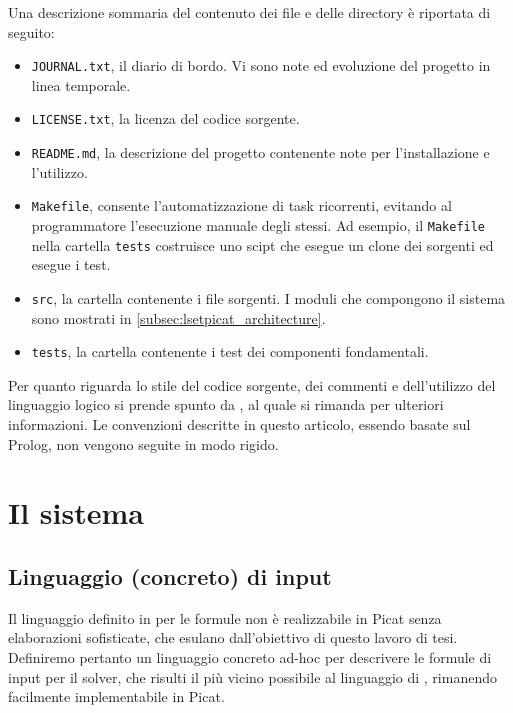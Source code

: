 \documentclass[12pt,a4paper,openright]{book} %
\begin{document}
Una descrizione sommaria del contenuto dei file e delle directory è
riportata di seguito:
\begin{itemize}
	\item \texttt{JOURNAL.txt}, il diario di bordo. Vi sono note
          ed evoluzione del progetto in linea temporale.
	\item \texttt{LICENSE.txt}, la licenza del codice sorgente.
	\item \texttt{README.md}, la descrizione del progetto
          contenente note per l'installazione e l'utilizzo.
	\item \texttt{Makefile}, consente l'automatizzazione di task
          ricorrenti, evitando al programmatore l'esecuzione manuale
          degli stessi. Ad esempio, il \texttt{Makefile} nella
          cartella \texttt{tests} costruisce uno scipt che esegue un
          clone dei sorgenti ed esegue i test.
	\item \texttt{src}, la cartella contenente i file sorgenti. I
          moduli che compongono il sistema sono mostrati in
          \ref{subsec:lsetpicat_architecture}.
	\item \texttt{tests}, la cartella contenente i test dei
          componenti fondamentali.
\end{itemize}

Per quanto riguarda lo stile del codice sorgente, dei commenti e
dell'utilizzo del linguaggio logico si prende spunto da
\cite{Covington12}, al quale si rimanda per ulteriori informazioni. Le
convenzioni descritte in questo articolo, essendo basate sul Prolog,
non vengono seguite in modo rigido.

\section{Il sistema}
\label{sec:lsetpicat_system}

\subsection{Linguaggio (concreto) di input}
\label{subsec:lsetpicat_concretelang}

Il linguaggio definito in \lset{} per le formule non è realizzabile in
Picat senza elaborazioni sofisticate, che esulano dall’obiettivo di
questo lavoro di tesi. Definiremo pertanto un linguaggio concreto
ad-hoc per descrivere le formule di input per il solver, che risulti
il più vicino possibile al linguaggio di \lset{}, rimanendo facilmente
implementabile in Picat.
\end{document}
